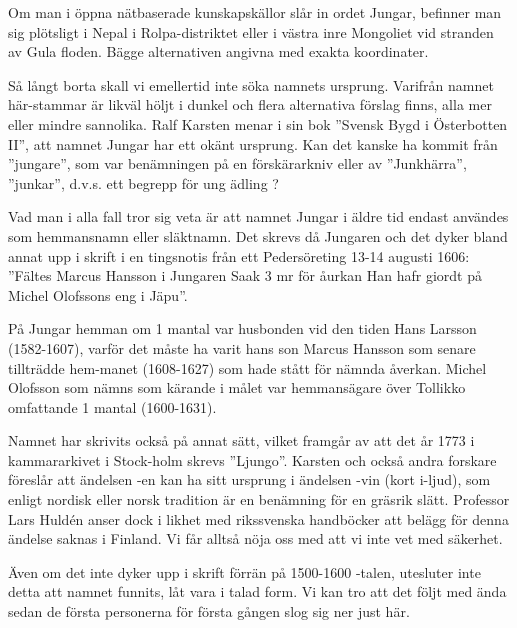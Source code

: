 

Om man i öppna nätbaserade kunskapskällor slår in ordet Jungar, befinner man sig plötsligt i Nepal i Rolpa-distriktet eller  i västra inre Mongoliet vid stranden av Gula floden. Bägge alternativen angivna med exakta koordinater.

Så långt borta skall vi emellertid inte söka namnets ursprung. Varifrån namnet här-stammar är likväl höljt i dunkel och flera alternativa förslag finns, alla mer eller mindre sannolika. Ralf Karsten menar i sin bok ”Svensk Bygd i Österbotten II”, att namnet Jungar har ett okänt ursprung. Kan det kanske ha kommit från ”jungare”, som var benämningen på en förskärarkniv eller av ”Junkhärra”, ”junkar”, d.v.s. ett begrepp för ung ädling ?

Vad man i alla fall tror sig veta är att namnet Jungar i äldre tid endast användes som hemmansnamn  eller släktnamn. Det skrevs då Jungaren och det dyker bland annat upp i skrift i en tingsnotis från ett Pedersöreting  13-14 augusti 1606: ”Fältes Marcus Hansson i Jungaren Saak 3 mr för åurkan Han hafr giordt på Michel Olofssons eng i Jäpu”.

På Jungar hemman om 1 mantal var husbonden vid den tiden Hans Larsson (1582-1607), varför det måste ha varit hans son Marcus Hansson som senare tillträdde hem-manet (1608-1627) som hade stått för nämnda åverkan.  Michel Olofsson som nämns som kärande i målet var hemmansägare över Tollikko omfattande 1 mantal (1600-1631).

Namnet har skrivits också på annat sätt, vilket framgår av att det år 1773 i kammararkivet i Stock-holm skrevs ”Ljungo”. Karsten och också andra forskare föreslår att ändelsen -en kan ha sitt ursprung i ändelsen -vin (kort i-ljud), som enligt nordisk eller norsk tradition är en benämning för en gräsrik slätt. Professor Lars Huldén anser dock i likhet med rikssvenska handböcker att belägg för denna ändelse saknas i Finland. Vi får alltså nöja oss med att vi inte vet med säkerhet.

Även om det inte dyker upp i skrift förrän på 1500-1600 -talen, utesluter inte detta att namnet funnits, låt vara i talad form. Vi kan tro att det följt med ända sedan de första personerna för första gången slog sig ner  just här.
